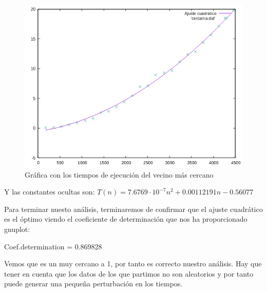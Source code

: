 \documentclass[10pt,a4paper]{article}
\begin{document}
 \begin{figure}[h!]
 	\centering
 	\includegraphics[scale=0.55]{./Images/cercania.png}
 	\caption{Gráfica con los tiempos de ejecución del vecino más cercano}
 \end{figure}
 
 \newpage
 
 Y las constantes ocultas son:
 \(T(n) = 7.6769 \cdot 10^{-7} n^2 + 0.00112191 n - 0.56077\)
 
 Para terminar nuesto análisis, terminaremos de confirmar que el ajuste cuadrático es el óptimo viendo el coeficiente de determinación que nos ha proporcionado gnuplot:
 
 Coef.determination = 0.869828
 
 Vemos que es un muy cercano a 1, por tanto es correcto nuestro análisis. Hay que tener en cuenta que los datos de los que partimos no son aleatorios y por tanto puede generar una pequeña perturbación en los tiempos.
\end{document}

